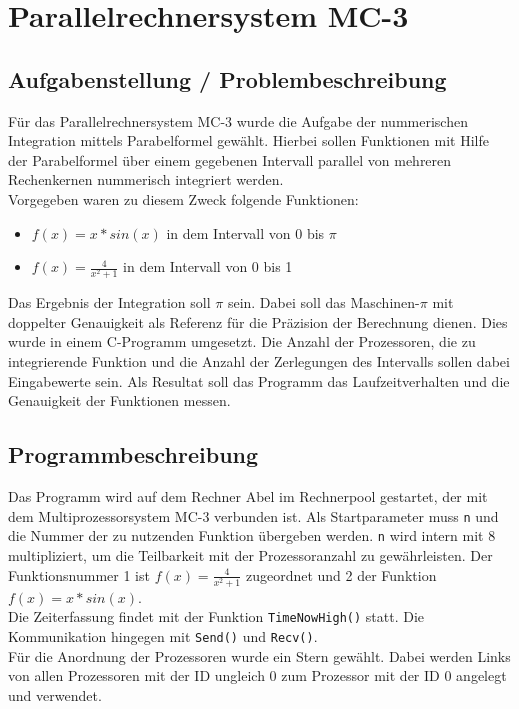 \documentclass[a4paper,12pt]{scrartcl}
\begin{document}
\clearpage
\section{Parallelrechnersystem MC-3}
\subsection{Aufgabenstellung / Problembeschreibung}
F\"ur das Parallelrechnersystem MC-3 wurde die Aufgabe der nummerischen Integration mittels Parabelformel gew\"ahlt. Hierbei sollen Funktionen mit Hilfe der
Parabelformel \"uber einem gegebenen Intervall parallel von mehreren Rechenkernen nummerisch integriert werden.\\
Vorgegeben waren zu diesem Zweck folgende Funktionen:
\begin{itemize}
 \item $f(x) = x*sin(x)$ in dem Intervall von 0 bis $\pi$
 \item $f(x) = \frac{4}{x^2+1}$ in dem Intervall von 0 bis 1
\end{itemize}
Das Ergebnis der Integration soll $\pi$ sein. Dabei soll das Maschinen-$\pi$ mit doppelter Genauigkeit als Referenz f\"ur die Pr\"azision der Berechnung
dienen. Dies wurde in einem C-Programm umgesetzt. Die Anzahl der Prozessoren, die zu integrierende Funktion und die Anzahl der Zerlegungen des Intervalls sollen
dabei Eingabewerte sein. Als Resultat soll das Programm das Laufzeitverhalten und die Genauigkeit der Funktionen messen.

\subsection{Programmbeschreibung}
Das Programm wird auf dem Rechner Abel im Rechnerpool gestartet, der mit dem Multiprozessorsystem MC-3 verbunden ist. Als Startparameter muss \texttt{n} und
die Nummer der zu nutzenden Funktion \"ubergeben werden. \texttt{n} wird intern mit 8 multipliziert, um die Teilbarkeit mit der Prozessoranzahl zu
gew\"ahrleisten. Der Funktionsnummer 1 ist $f(x) = \frac{4}{x^2+1}$ zugeordnet und 2 der Funktion $f(x) = x*sin(x)$.\\

Die Zeiterfassung findet mit der Funktion \texttt{TimeNowHigh()} statt. Die Kommunikation hingegen mit \texttt{Send()} und \texttt{Recv()}.\\
F\"ur die Anordnung der Prozessoren wurde ein Stern gew\"ahlt. Dabei werden Links von allen Prozessoren mit der ID ungleich 0 zum Prozessor mit der ID 0
angelegt und verwendet.\\
\end{document}
